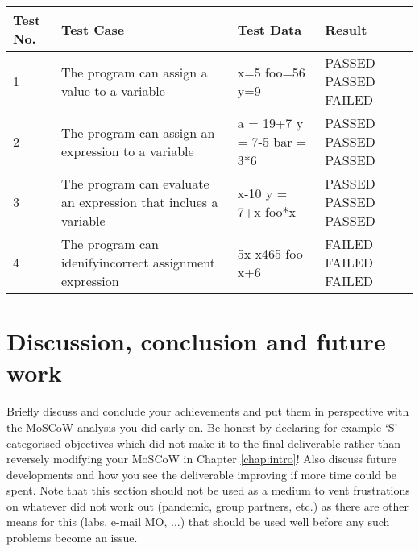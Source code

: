 \documentclass[a4paper, oneside, 11pt]{report}
\begin{document}
\begin{tabular}{|p{8mm}|p{60mm}|p{30mm}|p{15mm}|}Test No. & Test Case & Test Data & Result \\ \hline
1 & The program can assign a value to a variable & x=5 \newline foo=56 \newline y=9  &  PASSED \newline PASSED \newline FAILED \\
2 & The program can assign an expression to a variable & a = 19+7 \newline y = 7-5 \newline bar = 3*6  &  PASSED \newline PASSED \newline PASSED \\
3 & The program can evaluate an expression that inclues a variable & x-10 \newline y = 7+x \newline foo*x  &  PASSED \newline PASSED \newline PASSED \\
4 & The program can idenifyincorrect assignment expression & 5x \newline x465 \newline foo x+6  &  FAILED \newline FAILED \newline FAILED \\
\end{tabular}

\chapter{Discussion, conclusion and future work}

Briefly discuss and conclude your achievements and put them in perspective with the MoSCoW analysis you did early on. Be honest by declaring for example `S' categorised objectives which did not make it to the final deliverable rather than reversely modifying your MoSCoW in Chapter \ref{chap:intro}! Also discuss future developments and how you see the deliverable improving if more time could be spent. Note that this section should not be used as a medium to vent frustrations on whatever did not work out (pandemic, group partners, etc.) as there are other means for this (labs, e-mail MO, ...) that should be used well before any such problems become an issue.
\end{document}
